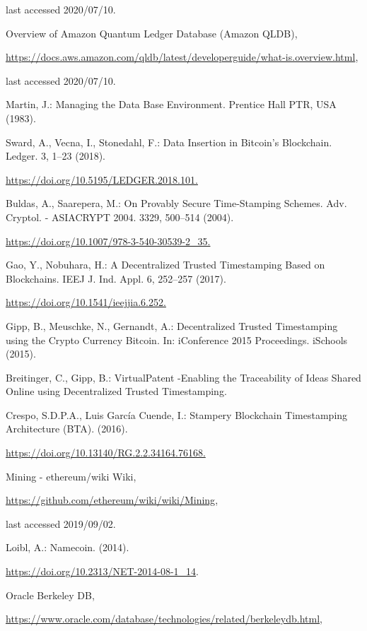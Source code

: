 \begin{multicols}{2}
\begin{thebibliography}{99}
last accessed 2020/07/10.

 Overview of Amazon Quantum Ledger Database (Amazon QLDB), 

\url{https://docs.aws.amazon.com/qldb/latest/developerguide/what-is.overview.html},

last accessed 2020/07/10.

 Martin, J.: Managing the Data Base Environment. Prentice Hall PTR, USA (1983).

 Sward, A., Vecna, I., Stonedahl, F.: Data Insertion in Bitcoin’s Blockchain. Ledger. 3, 1–23 (2018). 

\url{https://doi.org/10.5195/LEDGER.2018.101.}

 Buldas, A., Saarepera, M.: On Provably Secure Time-Stamping Schemes. Adv. Cryptol. - ASIACRYPT 2004. 3329, 500–514 (2004). 

\url{https://doi.org/10.1007/978-3-540-30539-2\_35.}

 Gao, Y., Nobuhara, H.: A Decentralized Trusted Timestamping Based on Blockchains. IEEJ J. Ind. Appl. 6, 252–257 (2017). 

\url{https://doi.org/10.1541/ieejjia.6.252.}

 Gipp, B., Meuschke, N., Gernandt, A.: Decentralized Trusted Timestamping using the Crypto Currency Bitcoin. In: iConference 2015 Proceedings. iSchools (2015).

 Breitinger, C., Gipp, B.: VirtualPatent -Enabling the Traceability of Ideas Shared Online using Decentralized Trusted Timestamping.

 Crespo, S.D.P.A., Luis García Cuende, I.: Stampery Blockchain Timestamping Architecture (BTA). (2016).

 \url{https://doi.org/10.13140/RG.2.2.34164.76168.}

 Mining - ethereum/wiki Wiki, 

\url{https://github.com/ethereum/wiki/wiki/Mining},

last accessed 2019/09/02.

 Loibl, A.: Namecoin. (2014). 

\url{https://doi.org/10.2313/NET-2014-08-1\_14}.

 Oracle Berkeley DB, 

\url{https://www.oracle.com/database/technologies/related/berkeleydb.html},


\end{thebibliography}
\end{multicols}
